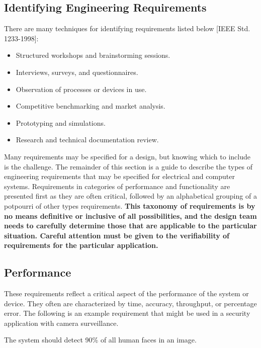 \subsection{Identifying Engineering Requirements}
\label{section:identifying-engineering-requirements}

There are many techniques for identifying requirements listed below
{[}IEEE Std. 1233-1998{]}:

\begin{itemize}
\item
  Structured workshops and brainstorming sessions.
\item
  Interviews, surveys, and questionnaires.
\item
  Observation of processes or devices in use.
\item
  Competitive benchmarking and market analysis.
\item
  Prototyping and simulations.
\item
  Research and technical documentation review.
\end{itemize}

Many requirements may be specified for a design, but knowing which to
include is the challenge. The remainder of this section is a guide to
describe the types of engineering requirements that may be specified for
electrical and computer systems. Requirements in categories of
performance and functionality are presented first as they are often
critical, followed by an alphabetical grouping of a potpourri of other
types requirements. \textbf{This taxonomy of requirements is by no means
definitive or inclusive of all possibilities, and the design team needs
to carefully determine those that are applicable to the particular
situation. Careful attention must be given to the verifiability of
requirements for the particular application.}

\subsection*{Performance}
\label{subsection:performance}

These requirements reflect a critical aspect of the performance of the
system or device. They often are characterized by time, accuracy,
throughput, or percentage error. The following is an example requirement
that might be used in a security application with camera surveillance.

\begin{itquote}
The system should detect 90\% of all human faces in an image.
\end{itquote}

